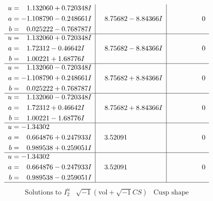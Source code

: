 \documentclass[1p]{elsarticle_modified}
\theoremstyle{definition}
\newcommand{\I}{\sqrt{-1}}
\begin{document}
$$\begin{array}{c|c|c}
\begin{aligned}
u &= \phantom{-}1.132060 + 0.720348 I \\
a &= -1.108790 - 0.248661 I \\
b &= \phantom{-}0.025222 - 0.768787 I\end{aligned}
 & \phantom{-}8.75682 - 8.84366 I & \phantom{-0.000000 } 0 \\ \hline\begin{aligned}
u &= \phantom{-}1.132060 + 0.720348 I \\
a &= \phantom{-}1.72312 - 0.46642 I \\
b &= \phantom{-}1.00221 + 1.68776 I\end{aligned}
 & \phantom{-}8.75682 - 8.84366 I & \phantom{-0.000000 } 0 \\ \hline\begin{aligned}
u &= \phantom{-}1.132060 - 0.720348 I \\
a &= -1.108790 + 0.248661 I \\
b &= \phantom{-}0.025222 + 0.768787 I\end{aligned}
 & \phantom{-}8.75682 + 8.84366 I & \phantom{-0.000000 } 0 \\ \hline\begin{aligned}
u &= \phantom{-}1.132060 - 0.720348 I \\
a &= \phantom{-}1.72312 + 0.46642 I \\
b &= \phantom{-}1.00221 - 1.68776 I\end{aligned}
 & \phantom{-}8.75682 + 8.84366 I & \phantom{-0.000000 } 0 \\ \hline\begin{aligned}
u &= -1.34302\phantom{ +0.000000I} \\
a &= \phantom{-}0.664876 + 0.247933 I \\
b &= \phantom{-}0.989538 + 0.259051 I\end{aligned}
 & \phantom{-}3.52091\phantom{ +0.000000I} & \phantom{-0.000000 } 0 \\ \hline\begin{aligned}
u &= -1.34302\phantom{ +0.000000I} \\
a &= \phantom{-}0.664876 - 0.247933 I \\
b &= \phantom{-}0.989538 - 0.259051 I\end{aligned}
 & \phantom{-}3.52091\phantom{ +0.000000I} & \phantom{-0.000000 } 0\\
 \hline 
 \end{array}$$\newpage$$\begin{array}{c|c|c}  
\text{Solutions to }I^u_{2}& \I (\text{vol} + \sqrt{-1}CS) & \text{Cusp shape}\\

\end{array}$$
\end{document}
